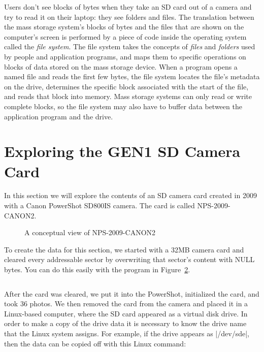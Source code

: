 \documentclass[11pt,letter]{book}
\newcommand{\figref}[1]{Figure~\ref{#1}\xspace}
\begin{document}
Users don't see blocks of bytes when they take an SD card out of a
camera and try to read it on their laptop: they see folders and
files. The translation between the mass storage system's blocks of
bytes and the files that are shown on the computer's screen is
performed by a piece of code inside the operating system called the
\emph{file system}.  The file system takes the concepts of
\emph{files} and \emph{folders} used by people and application
programs, and maps them to specific operations on blocks of data
stored on the mass storage device. When a program opens a named file
and reads the first few bytes, the file system locates the file's
metadata on the drive, determines the specific block associated with
the start of the file, and reads that block into memory. Mass storage
systems can only read or write complete blocks, so the file system may
also have to buffer data between the application program and the
drive.

\section{Exploring the GEN1 SD Camera Card}
In this section we will explore the contents of an SD camera card
created in 2009 with a Canon PowerShot SD800IS camera. The card is called NPS-2009-CANON2.

\begin{figure}
\caption{A conceptual view of NPS-2009-CANON2\label{nps-2009-canon2-conceptual}}
\end{figure}

To create the data for this section, we started with a 32MB camera
card and cleared every addressable sector by overwriting that sector's
content with NULL bytes. You can do this
easily with the program in \figref{overwrite}.


\lstset{basicstyle=\footnotesize,numbers=left,numberstyle=\tiny}

\begin{figure}
\begin{lstlisting}
\end{lstlisting}
\caption{}\label{overwrite}
\end{figure}

After the card was cleared, we put it into the PowerShot, initialized
the card, and took 36 photos. We then removed the card from the
camera and placed it in a Linux-based computer, where the SD card
appeared as a virtual disk drive. In order to make a copy of the drive
data it is necessary to know the drive name that the Linux system
assigns. For example, if the drive appears as |/dev/sde|, then the
data can be copied off with this Linux  command:
\end{document}
